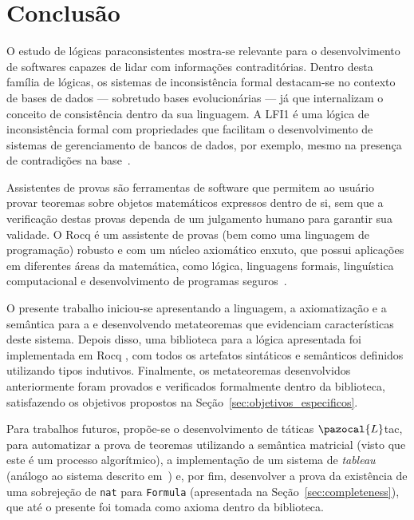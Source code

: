 \chapter{Conclusão}\label{chap:conclusao}

O estudo de lógicas paraconsistentes mostra-se relevante para o desenvolvimento de
softwares capazes de lidar com informações contraditórias. Dentro desta família de lógicas,
os sistemas de inconsistência formal destacam-se no contexto de bases de dados {---} sobretudo
bases evolucionárias {---} já que internalizam o conceito de consistência dentro da sua
linguagem. A LFI1 é uma lógica de inconsistência formal com propriedades que facilitam o
desenvolvimento de sistemas de gerenciamento de bancos de dados, por exemplo, mesmo na
presença de contradições na base~\cite{carnielli2000formal}.

Assistentes de provas são ferramentas de software que permitem ao usuário provar
teoremas sobre objetos matemáticos expressos dentro de si, sem que a verificação destas provas dependa
de um julgamento humano para garantir sua validade. O Rocq é um assistente de provas (bem
como uma linguagem de programação) robusto e com um núcleo axiomático enxuto, que possui
aplicações em diferentes áreas da matemática, como lógica, linguagens formais, linguística
computacional e desenvolvimento de programas seguros~\cite{coqart}.

O presente trabalho iniciou-se apresentando a linguagem, a axiomatização e a semântica para a \lfium{} e desenvolvendo metateoremas que evidenciam características deste sistema. Depois disso, uma biblioteca para a lógica apresentada foi implementada em Rocq , com todos os artefatos sintáticos e semânticos definidos utilizando tipos indutivos. Finalmente, os metateoremas desenvolvidos anteriormente foram provados e verificados formalmente dentro da biblioteca, satisfazendo os objetivos propostos na Seção~\ref{sec:objetivos_especificos}.

Para trabalhos futuros, propõe-se o desenvolvimento de táticas $\pazocal{L}$tac, para automatizar a prova de teoremas utilizando a semântica matricial (visto que este é um processo algorítmico), a implementação de um sistema de \textit{tableau} (análogo ao sistema descrito em~\cite{tableaulfi}) e, por fim, desenvolver a prova da existência de uma sobrejeção de \texttt{nat} para \texttt{Formula} (apresentada na Seção~\ref{sec:completeness}), que até o presente foi tomada como axioma dentro da biblioteca.